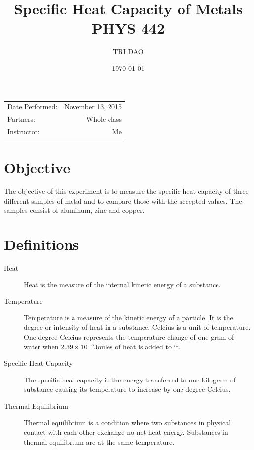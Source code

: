 \documentclass{article}
\title{Specific Heat Capacity of Metals \\ PHYS 442} %
\author{TRI DAO } %
\date{\today} %
\begin{document}
\maketitle %

\begin{center}
\begin{tabular}{l r}
Date Performed: & November 13, 2015 \\ %
Partners: & Whole class \\ %
Instructor: & Me %
\end{tabular}
\end{center}



\section{Objective}

The objective of this experiment is to measure the specific heat capacity of three different samples of metal and to compare those with the accepted values.  The samples consist of aluminum, zinc and copper.

\section{Definitions}
\label{definitions}
\begin{description}
\item[Heat]
Heat is the measure of the internal kinetic energy of a substance.
\item[Temperature]
Temperature is a measure of the kinetic energy of a particle.  It is the degree or intensity of heat in a substance.  Celcius is a unit of temperature.  One degree Celcius represents the temperature change of one gram of water when $2.39\times10^{-5}\text{Joules}$ of heat is added to it.

\item[Specific Heat Capacity]
The specific heat capacity is the energy transferred to one kilogram of substance causing its temperature to increase by one degree Celcius.\cite{Homer:2014}

\item[Thermal Equilibrium]
Thermal equilibrium is a condition where two substances in physical contact with each other exchange no net heat energy.  Substances in thermal equilibrium are at the same temperature.
\end{description}
\end{document}
